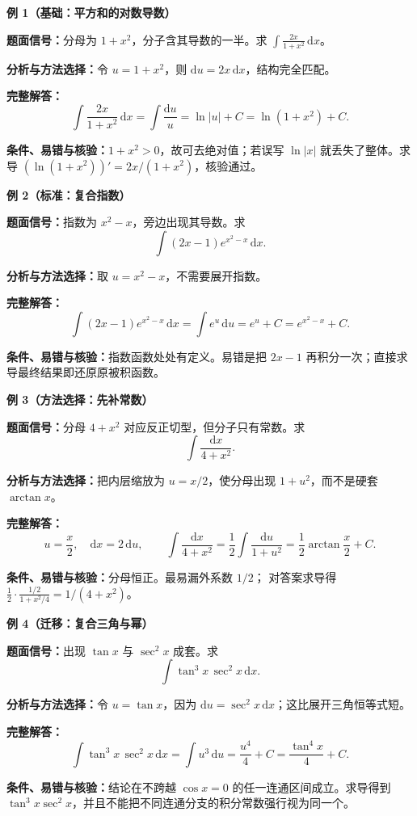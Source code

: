 \begin{knowledgeBox}
\textbf{例 1（基础：平方和的对数导数）}

\textbf{题面信号：}分母为 \(1+x^2\)，分子含其导数的一半。求
\(\int \frac{2x}{1+x^2}\,\mathrm dx\)。

\textbf{分析与方法选择：}令 \(u=1+x^2\)，则
\(\mathrm du=2x\,\mathrm dx\)，结构完全匹配。

\textbf{完整解答：}
\[
\int\frac{2x}{1+x^2}\,\mathrm dx
=\int\frac{\mathrm du}{u}
=\ln|u|+C=\ln(1+x^2)+C.
\]

\textbf{条件、易错与核验：}\(1+x^2>0\)，故可去绝对值；若误写
\(\ln|x|\) 就丢失了整体。求导
\((\ln(1+x^2))'=2x/(1+x^2)\)，核验通过。

\textbf{例 2（标准：复合指数）}

\textbf{题面信号：}指数为 \(x^2-x\)，旁边出现其导数。求
\[
\int(2x-1)e^{x^2-x}\,\mathrm dx.
\]

\textbf{分析与方法选择：}取 \(u=x^2-x\)，不需要展开指数。

\textbf{完整解答：}
\[
\int(2x-1)e^{x^2-x}\,\mathrm dx
=\int e^u\,\mathrm du=e^u+C
=e^{x^2-x}+C.
\]

\textbf{条件、易错与核验：}指数函数处处有定义。易错是把
\(2x-1\) 再积分一次；直接求导最终结果即还原原被积函数。

\textbf{例 3（方法选择：先补常数）}

\textbf{题面信号：}分母 \(4+x^2\) 对应反正切型，但分子只有常数。求
\[
\int\frac{\mathrm dx}{4+x^2}.
\]

\textbf{分析与方法选择：}把内层缩放为 \(u=x/2\)，使分母出现
\(1+u^2\)，而不是硬套 \(\arctan x\)。

\textbf{完整解答：}
\[
u=\frac x2,\quad \mathrm dx=2\,\mathrm du,
\qquad
\int\frac{\mathrm dx}{4+x^2}
=\frac12\int\frac{\mathrm du}{1+u^2}
=\frac12\arctan\frac x2+C.
\]

\textbf{条件、易错与核验：}分母恒正。最易漏外系数 \(1/2\)；
对答案求导得
\(\frac12\cdot\frac{1/2}{1+x^2/4}=1/(4+x^2)\)。

\textbf{例 4（迁移：复合三角与幂）}

\textbf{题面信号：}出现 \(\tan x\) 与 \(\sec^2x\) 成套。求
\[
\int \tan^3x\,\sec^2x\,\mathrm dx.
\]

\textbf{分析与方法选择：}令 \(u=\tan x\)，因为
\(\mathrm du=\sec^2x\,\mathrm dx\)；这比展开三角恒等式短。

\textbf{完整解答：}
\[
\int \tan^3x\,\sec^2x\,\mathrm dx
=\int u^3\,\mathrm du
=\frac{u^4}{4}+C
=\frac{\tan^4x}{4}+C.
\]

\textbf{条件、易错与核验：}结论在不跨越
\(\cos x=0\) 的任一连通区间成立。求导得到
\(\tan^3x\sec^2x\)，并且不能把不同连通分支的积分常数强行视为同一个。


\end{knowledgeBox}
